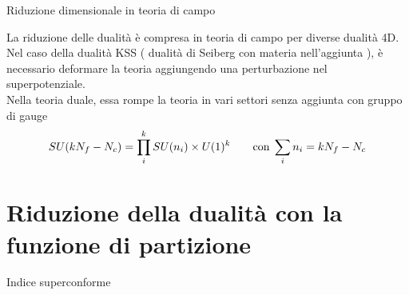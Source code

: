 \documentclass[10pt,compress]{beamer}
\begin{document}
\begin{frame}{Riduzione dimensionale in teoria di campo}

La riduzione delle dualità è compresa in teoria di campo per diverse dualità 4D.\\
\vspace{0.3cm}
Nel caso della dualità KSS ( dualità di Seiberg con materia nell'aggiunta ),
è necessario deformare la teoria aggiungendo una perturbazione nel superpotenziale. \\
\vspace{0.3cm}
Nella teoria duale, essa rompe la teoria in vari settori senza aggiunta con gruppo di gauge 
$$
SU(k N_f - N_c)  = \prod_i^k SU(n_i) \times U(1)^k
\qquad \hbox{con} \; \sum_i n_i = k N_f - N_c
$$
\end{frame}








\section{Riduzione della dualità con la funzione di partizione}
\begin{frame}{Indice superconforme}


\end{frame}






\nocite{*}
%

\end{document}
